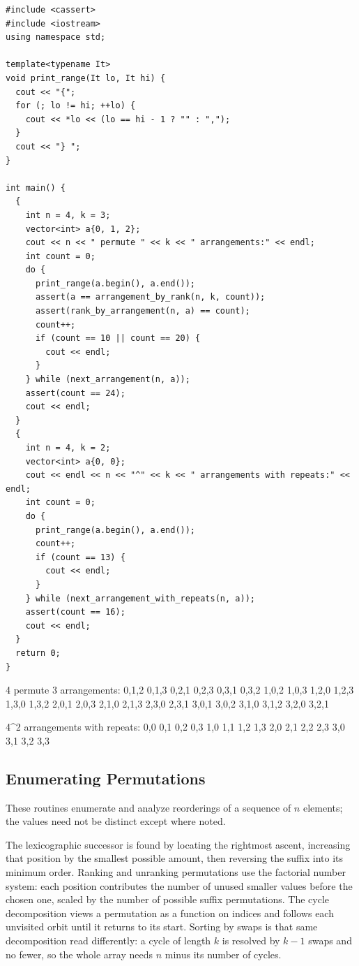 \begin{lstlisting}[style=cpp]
#include <cassert>
#include <iostream>
using namespace std;

template<typename It>
void print_range(It lo, It hi) {
  cout << "{";
  for (; lo != hi; ++lo) {
    cout << *lo << (lo == hi - 1 ? "" : ",");
  }
  cout << "} ";
}

int main() {
  {
    int n = 4, k = 3;
    vector<int> a{0, 1, 2};
    cout << n << " permute " << k << " arrangements:" << endl;
    int count = 0;
    do {
      print_range(a.begin(), a.end());
      assert(a == arrangement_by_rank(n, k, count));
      assert(rank_by_arrangement(n, a) == count);
      count++;
      if (count == 10 || count == 20) {
        cout << endl;
      }
    } while (next_arrangement(n, a));
    assert(count == 24);
    cout << endl;
  }
  {
    int n = 4, k = 2;
    vector<int> a{0, 0};
    cout << endl << n << "^" << k << " arrangements with repeats:" << endl;
    int count = 0;
    do {
      print_range(a.begin(), a.end());
      count++;
      if (count == 13) {
        cout << endl;
      }
    } while (next_arrangement_with_repeats(n, a));
    assert(count == 16);
    cout << endl;
  }
  return 0;
}
\end{lstlisting}
\begin{exampleoutput}
4 permute 3 arrangements:
{0,1,2} {0,1,3} {0,2,1} {0,2,3} {0,3,1} {0,3,2} {1,0,2} {1,0,3} {1,2,0} {1,2,3}
{1,3,0} {1,3,2} {2,0,1} {2,0,3} {2,1,0} {2,1,3} {2,3,0} {2,3,1} {3,0,1} {3,0,2}
{3,1,0} {3,1,2} {3,2,0} {3,2,1}

4^2 arrangements with repeats:
{0,0} {0,1} {0,2} {0,3} {1,0} {1,1} {1,2} {1,3} {2,0} {2,1} {2,2} {2,3} {3,0}
{3,1} {3,2} {3,3}
\end{exampleoutput}
\subsection{Enumerating Permutations}
\label{sec:6.2.3}
These routines enumerate and analyze reorderings of a sequence of $n$ elements; the values need not be distinct except where noted.

The lexicographic successor is found by locating the rightmost ascent, increasing that position by the smallest possible amount, then reversing the suffix into its minimum order. Ranking and unranking permutations use the factorial number system: each position contributes the number of unused smaller values before the chosen one, scaled by the number of possible suffix permutations. The cycle decomposition views a permutation as a function on indices and follows each unvisited orbit until it returns to its start. Sorting by swaps is that same decomposition read differently: a cycle of length $k$ is resolved by $k - 1$ swaps and no fewer, so the whole array needs $n$ minus its number of cycles.

